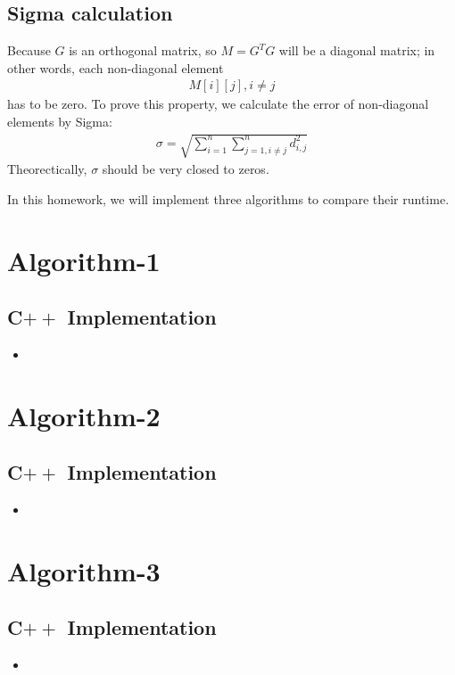 \documentclass{article}
\newcommand{\cppscript}[2]{
\begin{itemize}
\item[]
\end{itemize}
}
\begin{document}
\subsection{Sigma calculation}
Because $G$ is an orthogonal matrix, so $M = G^TG$ will be a diagonal matrix; in other words, each non-diagonal element \newline
\begin{gather}
    M[i][j], i \neq j
\end{gather}
has to be zero. To prove this property, we calculate the error of non-diagonal elements by Sigma: \newline
\begin{gather}
    \sigma = \sqrt{\sum_{i=1}^{n}\sum_{j=1,i \neq j}^{n}d_{i,j}^2}
\end{gather}
Theorectically, $\sigma$ should be very closed to zeros. \newline \newline

In this homework, we will implement three algorithms to compare their runtime.
\newpage

\section{Algorithm-1}
\subsection{C$++$ Implementation}
\cppscript{src/algo1.cpp}{algo1 implementation}

\section{Algorithm-2}
\subsection{C$++$ Implementation}
\cppscript{src/algo2.cpp}{algo2 implementation}

\section{Algorithm-3}
\subsection{C$++$ Implementation}
\cppscript{src/algo3.cpp}{algo3 implementation}
\end{document}
